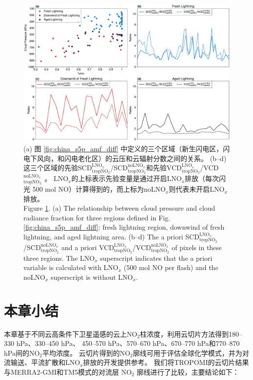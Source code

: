 \begin{figure}[!htbp]
    \centering
    \includegraphics[width=14cm]{./figures/china_amf_contribution.pdf}
    \caption{
    (a) 图 \ref{fig:china_s5p_amf_diff} 中定义的三个区域（新生闪电区，闪电下风向，和闪电老化区）的云压和云辐射分数之间的关系。
     (b--d) 这三个区域的先验SCD$^{\textrm{LNO$_x$}}_{\textrm{tropNO$_2$}}$/SCD$^{\textrm{noLNO$_x$}}_{ \textrm{tropNO$_2$}}$和先验VCD$^{\textrm{LNO$_x$}}_{\textrm{tropNO$_2$}}$/VCD$^{\textrm{noLNO$_x$ }}_{\textrm{tropNO$_2$}}$。
     LNO$_x$的上标表示先验变量是通过开启LNO$_x$排放（每次闪光 500 mol NO）计算得到的，而上标为noLNO$_x$则代表未开启LNO$_x$排放。\\
     Figure \ref{fig:china_amf_contribution}. (a) The relationship between cloud pressure and cloud radiance fraction for three regions defined in Fig. \ref{fig:china_s5p_amf_diff}: fresh lightning region, downwind of fresh lightning, and aged lightning area.
    (b--d) The a priori SCD$^{\textrm{LNO$_x$}}_{\textrm{tropNO$_2$}}$/SCD$^{\textrm{noLNO$_x$}}_{\textrm{tropNO$_2$}}$ and a priori VCD$^{\textrm{LNO$_x$}}_{\textrm{tropNO$_2$}}$/VCD$^{\textrm{noLNO$_x$}}_{\textrm{tropNO$_2$}}$ of pixels in these three regions. The LNO$_x$ superscript indicates that the a priori variable is calculated with LNO$_x$ (500 mol NO per flash) and the noLNO$_x$ superscript is without LNO$_x$.
    }
    \label{fig:china_amf_contribution}
\end{figure}


\section{本章小结}

本章基于不同云高条件下卫星遥感的云上NO$_2$柱浓度，利用云切片方法得到180--330 hPa、330--450 hPa、
450--570 hPa、570--670 hPa、670--770 hPa和770--870 hPa间的NO$_2$平均浓度。
云切片得到的NO$_2$廓线可用于评估全球化学模式，并为对流输送、平流扩散和LNO$_x$排放的开发提供参考。
我们将TROPOMI的云切片结果与MERRA2-GMI和TM5模式的对流层 NO$_2$ 廓线进行了比较，主要结论如下：

